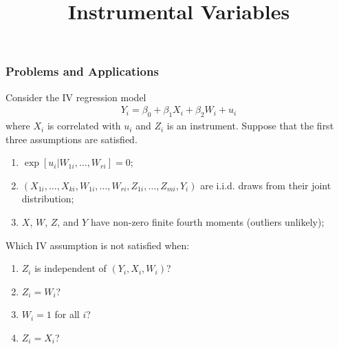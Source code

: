 \title[Instrumental Variables]{Instrumental Variables}
\date{}







\begin{frame}
\frametitle{Problems and Applications}
Consider the IV regression model
\begin{align*}
Y_{i} = \beta_{0} + \beta_{1} X_{i} + \beta_{2} W_{i} + u_{i}
\end{align*}
where $X_{i}$ is correlated with $u_{i}$ and $Z_{i}$ is an instrument. Suppose that the first three assumptions are satisfied. 
\begin{enumerate}
\item<1-> $\exp[u_{i}|W_{1i},\ldots,W_{ri}]=0$;
\item<1-> $(X_{1i},\ldots,X_{ki},W_{1i},\ldots,W_{ri},Z_{1i},\ldots,Z_{mi},Y_{i})$ are i.i.d. draws from their joint distribution;
\item $X$, $W$, $Z$, and $Y$ have non-zero finite fourth moments (outliers unlikely);
\end{enumerate}
Which IV assumption is not satisfied when:
\begin{enumerate}
\item<1-> $Z_{i}$ is independent of $(Y_{i}, X_{i}, W_{i})$?
\item<1-> $Z_{i}=W_{i}$?
\item<1-> $W_{i}=1$ for all $i$?
\item<1-> $Z_{i}=X_{i}$?
\end{enumerate}
\end{frame}


